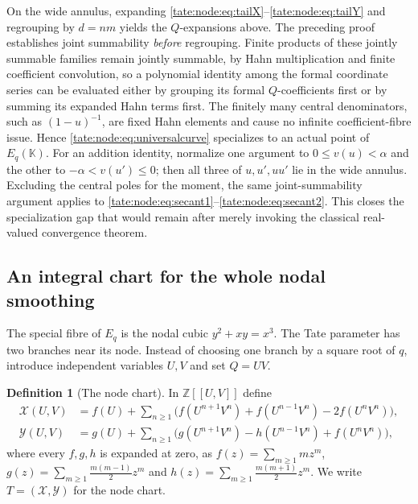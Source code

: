 \documentclass[11pt,letterpaper]{article}
\theoremstyle{definition}
\newtheorem{definition}[definition]{Definition}
\newcommand{\Z}{\mathbb Z}
\newcommand{\X}{\mathcal X}
\newcommand{\Y}{\mathcal Y}
\newcommand{\KK}{\mathbb K}
\begin{document}
On the wide annulus, expanding \eqref{tate:node:eq:tailX}--\eqref{tate:node:eq:tailY}
and regrouping by $d=nm$ yields the $Q$-expansions above. The preceding
proof establishes joint summability \emph{before} regrouping. Finite
products of these jointly summable families remain jointly summable, by Hahn
multiplication and finite coefficient convolution, so a polynomial identity
among the formal coordinate series can be evaluated either by grouping its
formal $Q$-coefficients first or by summing its expanded Hahn terms first.
The finitely many central denominators, such as $(1-u)^{-1}$, are fixed
Hahn elements and cause no infinite coefficient-fibre issue. Hence
\eqref{tate:node:eq:universalcurve} specializes to an actual point of
$E_q(\KK)$. For an addition identity, normalize one argument to
$0\le v(u)<\alpha$ and the other to $-\alpha<v(u')\le0$; then all three of
$u,u',uu'$ lie in the wide annulus. Excluding the central poles for the
moment, the same joint-summability argument applies to
\eqref{tate:node:eq:secant1}--\eqref{tate:node:eq:secant2}. This closes the
specialization gap that would remain after merely invoking the classical
real-valued convergence theorem.

\subsection{An integral chart for the whole nodal smoothing}

The special fibre of $E_q$ is the nodal cubic $y^2+xy=x^3$. The Tate
parameter has two branches near its node. Instead of choosing one branch by
a square root of $q$, introduce independent variables $U,V$ and set $Q=UV$.

\begin{definition}[The node chart]\label{tate:node:def:node}
In $\Z[[U,V]]$ define
\begin{align}
 \X(U,V)&=f(U)+\sum_{n\ge1}
 \bigl(f(U^{n+1}V^n)+f(U^{n-1}V^n)-2f(U^nV^n)\bigr),\label{tate:node:eq:nodeX}\\
 \Y(U,V)&=g(U)+\sum_{n\ge1}
 \bigl(g(U^{n+1}V^n)-h(U^{n-1}V^n)+f(U^nV^n)\bigr),\label{tate:node:eq:nodeY}
\end{align}
where every $f,g,h$ is expanded at zero, as
$f(z)=\sum_{m\ge1}mz^m$, $g(z)=\sum_{m\ge1}\frac{m(m-1)}2z^m$ and
$h(z)=\sum_{m\ge1}\frac{m(m+1)}2z^m$. We write $T=(\X,\Y)$ for the node
chart.
\end{definition}
\end{document}
